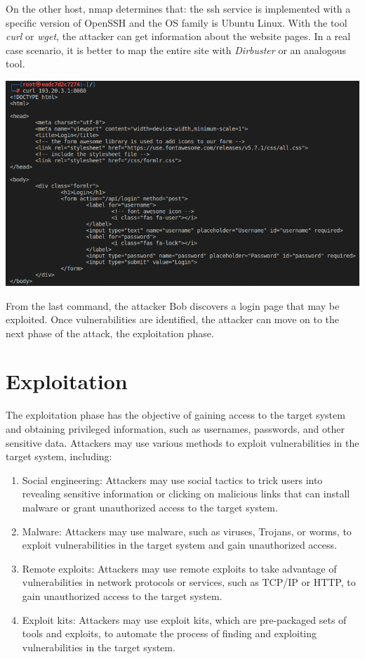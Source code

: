 \documentclass[a4paper, 12pt, oneside]{extbook}
\begin{document}
On the other host, nmap determines that: the ssh service is implemented with a specific version of OpenSSH and the OS family is Ubuntu Linux. 
\newline With the tool \textit{curl} or \textit{wget}, the attacker can get information about the website pages. In a real case scenario, it is better to map the entire site with \textit{Dirbuster} or an analogous tool.
\begin{center}
  \includegraphics[scale=0.66]{../Image/webserver_curl.PNG}
\end{center}
From the last command, the attacker Bob discovers a login page that may be exploited.
Once vulnerabilities are identified, the attacker can move on to the next phase of the attack, the exploitation phase.

\chapter{Exploitation}
The exploitation phase has the objective of gaining access to the target system and obtaining privileged information, such as usernames, passwords, and other sensitive data. 
Attackers may use various methods to exploit vulnerabilities in the target system, including:
\begin{enumerate}
  \item Social engineering: Attackers may use social tactics to trick users into revealing sensitive information or clicking on malicious links that can install malware or grant unauthorized access to the target system.
  \item Malware: Attackers may use malware, such as viruses, Trojans, or worms, to exploit vulnerabilities in the target system and gain unauthorized access.
  \item Remote exploits: Attackers may use remote exploits to take advantage of vulnerabilities in network protocols or services, such as TCP/IP or HTTP, to gain unauthorized access to the target system.
  \item Exploit kits: Attackers may use exploit kits, which are pre-packaged sets of tools and exploits, to automate the process of finding and exploiting vulnerabilities in the target system.
\end{enumerate}
\end{document}
